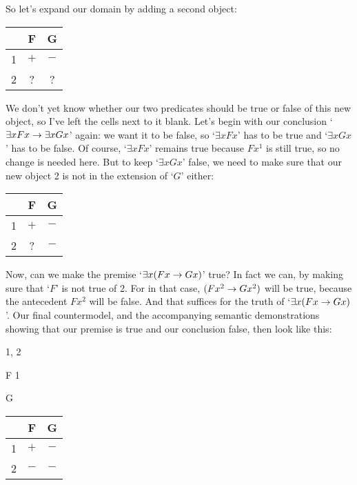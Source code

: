 So let's expand our domain by adding a second object:
\begin{center}\begin{tabular}{|c|c|c|}
\hline
&   F  & G  \\ \hline
1   &   $+$  & $-$  \\ \hline
2 &     ?    &  ?    \\ \hline
\end{tabular}\end{center}
We don't yet know whether our two predicates should be true or false of this new object, so I've left the cells next to it blank.  Let's begin with our conclusion `$\exists xFx \rightarrow \exists xGx$' again: we want it to be false, so `$\exists xFx$' has to be true and `$\exists xGx$' has to be false.  Of course, `$\exists xFx$' remains true because $Fx^1$ is still true, so no change is needed here.  But to keep `$\exists xGx$' false, we need to make sure that our new object 2 is not in the extension of `$G$' either:
\begin{center}\begin{tabular}{|c|c|c|}
\hline
&   F  & G  \\ \hline
1   &   $+$  & $-$  \\ \hline
2 &     ?    &   $-$   \\ \hline
\end{tabular}\end{center}
Now, can we make the premise `$\exists x(Fx \rightarrow Gx)$' true?  In fact we can, by making sure that `$F$' is not true of 2.  For in that case, $(Fx^2 \rightarrow Gx^2)$ will be true, because the antecedent $Fx^2$ will be false.  And that suffices for the truth of `$\exists x(Fx \rightarrow Gx)$'.  Our final countermodel, and the accompanying semantic demonstrations showing that our premise is true and our conclusion false, then look like this:

\begin{center}
\begin{minipage}{0.7\textwidth}
\begin{multicols}{2}
\begin{ekey}
	\item[\text{Domain}] 1, 2
	\item[F] 1
	\item[G]
\end{ekey}
\columnbreak
\begin{tabular}{|c|c|c|}
\hline
&   F  & G  \\ \hline
1   &   $+$  & $-$  \\ \hline
2 &     $-$    &   $-$   \\ \hline
\end{tabular}
\end{multicols}\end{minipage}\end{center}



